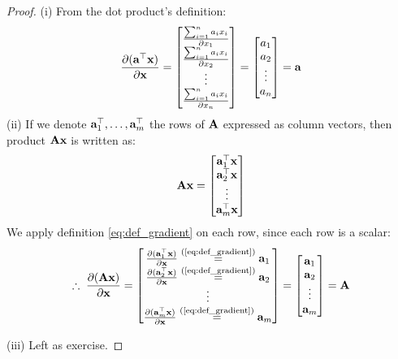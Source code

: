 \documentclass[a4paper]{article}
\begin{document}
\begin{proof} \quad

(i)
From the dot product's definition:
\[
\frac{\partial (\textbf{a}^{\top} \textbf{x})}{\partial \textbf{x}}  =
\begin{bmatrix}
\frac{\sum_{i=1}^n a_ix_i}{\partial x_1} \\ \frac{\sum_{i=1}^n a_ix_i}{\partial x_2} \\ \vdots \\ \frac{\sum_{i=1}^n a_ix_i}{\partial x_n}
\end{bmatrix}
=
\begin{bmatrix}
a_1 \\ a_2 \\ \vdots \\ a_n
\end{bmatrix} = \textbf{a}
\]
(ii) If we denote $\textbf{a}_1^{\top},\ldots,\textbf{a}_m^{\top}$ the rows of $\textbf{A}$ expressed as column vectors, then  product $\textbf{A}\textbf{x}$ is written as:
\[
\textbf{A}\textbf{x} = 
\begin{bmatrix}
\textbf{a}_1^{\top} \textbf{x} \\
\textbf{a}_2^{\top} \textbf{x} \\
\vdots \\
\textbf{a}_m^{\top} \textbf{x}
\end{bmatrix}
\]
We apply definition \eqref{eq:def_gradient} on each row, since each row is a scalar:
\[
\therefore \; \frac{\partial ( \textbf{A}\textbf{x})}{\partial \textbf{x}} =
\begin{bmatrix}
\frac{\partial(\textbf{a}_1^{\top}\textbf{x})}{\partial \textbf{x}}  \stackrel{\text{(\ref{eq:def_gradient}})}{=} \textbf{a}_1 \\
\frac{\partial(\textbf{a}_2^{\top}\textbf{x})}{\partial \textbf{x}} \stackrel{\text{(\ref{eq:def_gradient}})}{=} \textbf{a}_2 \\
\vdots  \\
\frac{\partial(\textbf{a}_m^{\top}\textbf{x})}{\partial \textbf{x}}  \stackrel{\text{(\ref{eq:def_gradient}})}{=} \textbf{a}_m \\
\end{bmatrix}
= 
\begin{bmatrix}
\textbf{a}_1 \\
\textbf{a}_2 \\
\vdots \\
\textbf{a}_m
\end{bmatrix}
= \textbf{A}
\]

(iii) Left as exercise.


\end{proof}
\end{document}
